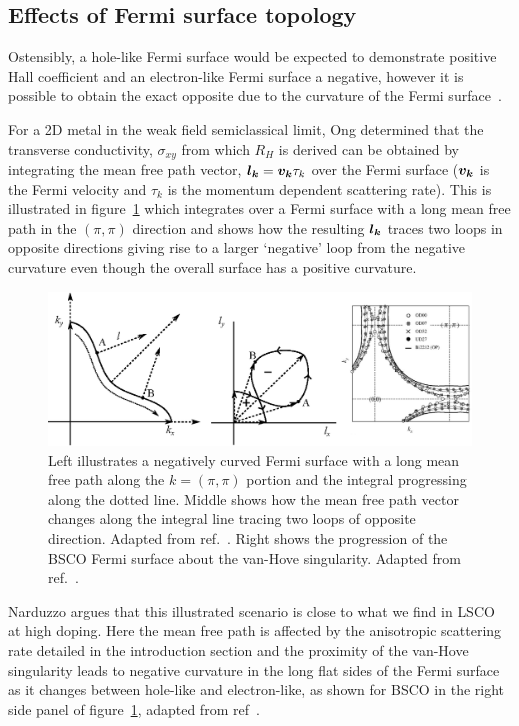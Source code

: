\subsection{Effects of Fermi surface topology}
    \label{Sec:Theo:TopologyEffects}

Ostensibly, a hole-like Fermi surface would be expected to demonstrate positive Hall coefficient and an electron-like Fermi surface a negative, however it is possible to obtain the exact opposite due to the curvature of the Fermi surface~\cite{Narduzzo2008}. 

For a 2D metal in the weak field semiclassical limit, Ong determined that the transverse conductivity, $\sigma_{xy}$ from which $R_H$ is derived can be obtained by integrating the mean free path vector, $\boldsymbol{l_k} = \boldsymbol{v_k}\tau_k$ over the Fermi surface ($\boldsymbol{v_k}$ is the Fermi velocity and $\tau_k$ is the momentum dependent scattering rate). This is illustrated in figure~\ref{Fig:Theo:NegativeCurvatureLSCO} which integrates over a Fermi surface with a long mean free path in the $(\pi, \pi)$ direction and shows how the resulting $\boldsymbol{l_k}$ traces two loops in opposite directions giving rise to a larger `negative' loop from the negative curvature even though the overall surface has a positive curvature.
\begin{figure}[htbp]
    \begin{center}
        \includegraphics[scale=0.9]{Chapter-Theory/Figures/NegativeCurvatureLSCO/NegativeCurvatureLSCO}
        \caption{Left illustrates a negatively curved Fermi surface with a long mean free path along the $k = (\pi, \pi)$ portion and the integral progressing along the dotted line. Middle shows how the mean free path vector changes along the integral line tracing two loops of opposite direction. Adapted from ref.~\cite{Narduzzo2008}. Right shows the progression of the \ac{BSCO} Fermi surface about the van-Hove singularity. Adapted from ref.~\cite{Kondo2004}.}
        \label{Fig:Theo:NegativeCurvatureLSCO}
    \end{center}
\end{figure}
Narduzzo \etal{} argues that this illustrated scenario is close to what we find in \ac{LSCO} at high doping. Here the mean free path is affected by the anisotropic scattering rate detailed in the introduction section and the proximity of the van-Hove singularity leads to negative curvature in the long flat sides of the Fermi surface as it changes between hole-like and electron-like, as shown for \ac{BSCO} in the right side panel of figure~\ref{Fig:Theo:NegativeCurvatureLSCO}, adapted from ref~\cite{Kondo2004}.

